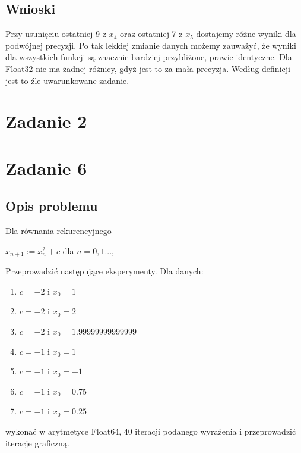 \documentclass{article}
\begin{document}
\subsection{Wnioski}
	Przy usunięciu ostatniej 9 z $x_4$ oraz ostatniej 7 z $x_5$ dostajemy różne wyniki dla podwójnej precyzji.
	Po tak lekkiej zmianie danych możemy zauważyć, że wyniki dla wszystkich funkcji są znacznie bardziej przybliżone, prawie identyczne.
	Dla Float32 nie ma żadnej różnicy, gdyż jest to za mała precyzja. Według definicji jest to źle uwarunkowane zadanie.

\section{Zadanie 2}

\section{Zadanie 6}
\subsection{Opis problemu}
	Dla równania rekurencyjnego \\
	\centerline{$x_{n+1} := x_n^2 + c$ dla $n = 0, 1...,$ \\}
	Przeprowadzić następujące eksperymenty. Dla danych:
	\begin{enumerate}
        \item $c = -2$ i $x_0 = 1$
        \item $c = -2$ i $x_0 = 2$
        \item $c = -2$ i $x_0 = 1.99999999999999$
        \item $c = -1$ i $x_0 = 1$
        \item $c = -1$ i $x_0 = -1$
        \item $c = -1$ i $x_0 = 0.75$
        \item $c = -1$ i $x_0 = 0.25$
    \end{enumerate}
    wykonać w arytmetyce Float64, 40 iteracji podanego wyrażenia i przeprowadzić iteracje graficzną.
\end{document}
